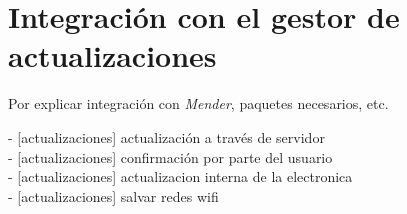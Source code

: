 \section{Integración con el gestor de actualizaciones}

Por explicar integración con \textit{Mender}, paquetes necesarios, etc.

- [actualizaciones] actualización a través de servidor\\
- [actualizaciones] confirmación por parte del usuario\\
- [actualizaciones] actualizacion interna de la electronica\\
- [actualizaciones] salvar redes wifi\\

\newpage